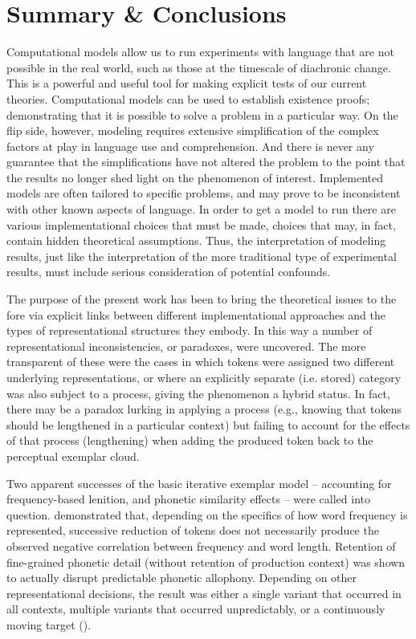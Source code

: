 \section{Summary \& Conclusions}

Computational models allow us to run experiments with language that
are not possible in the real world, such as those at the timescale
of diachronic change. This is a powerful and useful tool for making
explicit tests of our current theories. Computational models can be
used to establish existence proofs; demonstrating that it is possible
to solve a problem in a particular way. On the flip side, however,
modeling requires extensive simplification of the complex factors
at play in language use and comprehension. And there is never any
guarantee that the simplifications have not altered the problem to
the point that the results no longer shed light on the phenomenon
of interest. Implemented models are often tailored to specific problems,
and may prove to be inconsistent with other known aspects of language.
In order to get a model to run there are various implementational
choices that must be made, choices that may, in fact, contain hidden
theoretical assumptions. Thus, the interpretation of modeling results,
just like the interpretation of the more traditional type of experimental
results, must include serious consideration of potential confounds. 

The purpose of the present work has been to bring the theoretical
issues to the fore via explicit links between different implementational
approaches and the types of representational structures they embody.
In this way a number of representational inconsistencies, or paradoxes,
were uncovered. The more transparent of these were the cases in which
tokens were assigned two different underlying representations, or
where an explicitly separate (i.e. stored) category was also subject
to a process, giving the phenomenon a hybrid 
status. In fact, there may be a paradox lurking in applying a process
(e.g., knowing that tokens should be lengthened in a particular context)
but failing to account for the effects of that process (lengthening)
when adding the produced token back to the perceptual exemplar cloud. 

Two apparent successes of the basic iterative exemplar model – accounting
for frequency-based lenition, and phonetic similarity effects – were
called into question. 
demonstrated that, depending on the specifics of how word frequency
is represented, successive reduction of tokens does not necessarily
produce the observed negative correlation between frequency and word
length. Retention of fine-grained phonetic detail (without retention
of production context) was shown to actually disrupt predictable phonetic
allophony. Depending on other representational decisions, the result
was either a single variant that occurred in all contexts, multiple
variants that occurred unpredictably, or a continuously moving target
(). 

